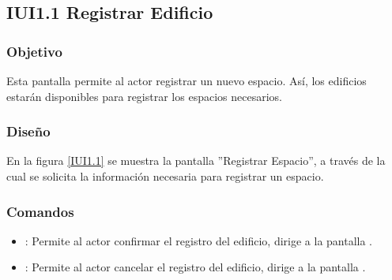 \subsection{IUI1.1 Registrar Edificio}

\subsubsection{Objetivo}
	Esta pantalla permite al actor registrar un nuevo espacio. Así, los edificios estarán disponibles para registrar los espacios necesarios.

\subsubsection{Diseño}
    En la figura \ref{IUI1.1} se muestra la pantalla ''Registrar Espacio'', a través de la cual se solicita la información necesaria para registrar un espacio.
 

\subsubsection{Comandos}
    \begin{itemize}
	\item {}: Permite al actor confirmar el registro del edificio, dirige a la pantalla .
	
	\item {}: Permite al actor cancelar el registro del edificio, dirige a la pantalla .
    \end{itemize}
